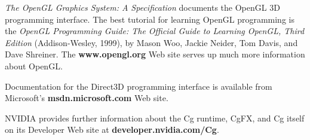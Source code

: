\documentclass[../main.tex]{subfiles}
\begin{document}
\textit{The OpenGL Graphics System: A Specification} documents the OpenGL 3D programming interface. The best tutorial for learning OpenGL programming is the \textit{OpenGL Programming Guide: The Official Guide to Learning OpenGL, Third Edition} (Addison-Wesley, 1999), by Mason Woo, Jackie Neider, Tom Davis, and Dave Shreiner. The \textbf{www.opengl.org} Web site serves up much more information about OpenGL.

Documentation for the Direct3D programming interface is available from Microsoft's \textbf{msdn.microsoft.com} Web site.

NVIDIA provides further information about the Cg runtime, CgFX, and Cg itself on its Developer Web site at \textbf{developer.nvidia.com/Cg}.
\end{document}
